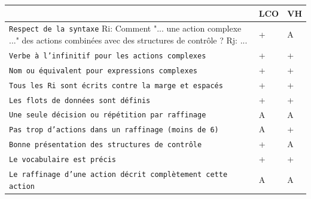 \documentclass{article}
\begin{document}
\vspace{2em}
\hspace{-1cm}
\begin{center}
    \begin{tabular}{|p{11cm}|p{1cm}|p{1cm}|}
        \hline
                                                                                                                                                 & LCO & VH \\

        \hline
        \texttt{Respect de la syntaxe} Ri: Comment "... une action complexe ..." des actions combinées avec des structures de contrôle ? Rj: ... & +   & A  \\
        \hline
        \texttt{Verbe à l'infinitif pour les actions complexes}                                                                                  & +   & +  \\
        \hline
        \texttt{Nom ou équivalent pour expressions complexes}                                                                                    & +   & +  \\
        \hline
        \texttt{Tous les Ri sont écrits contre la marge et espacés}                                                                              & +   & +  \\
        \hline
        \texttt{Les flots de données sont définis}                                                                                               & +   & +  \\
        \hline
        \texttt{Une seule décision ou répétition par raffinage}                                                                                  & A   & A  \\
        \hline
        \texttt{Pas trop d'actions dans un raffinage (moins de 6)}                                                                               & A   & +  \\
        \hline
        \texttt{Bonne présentation des structures de contrôle}                                                                                   & +   & A  \\
        \hline
        \texttt{Le vocabulaire est précis}                                                                                                       & +   & +  \\
        \hline
        \texttt{Le raffinage d'une action décrit complètement cette action}                                                                      & A   & A  \\

\end{tabular}
\end{center}
\end{document}
